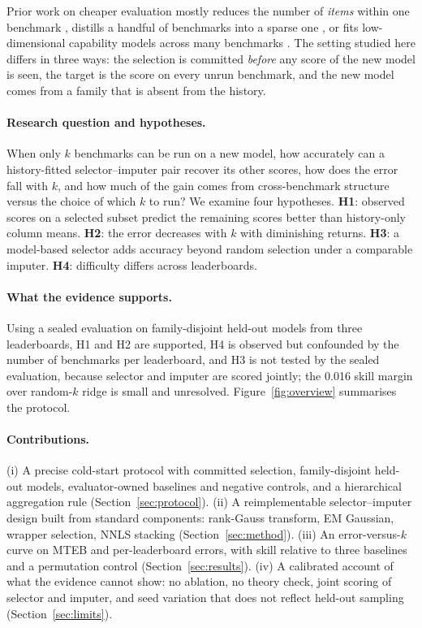 \documentclass{article}
\begin{document}
Prior work on cheaper evaluation mostly reduces the number of \emph{items} within one benchmark \citep{Polo2024TinyBenchmarks,Vivek2024AnchorPoints,Perlitz2024EfficientBenchmarking}, distills a handful of benchmarks into a sparse one \citep{Kipnis2024Metabench}, or fits low-dimensional capability models across many benchmarks \citep{Ruan2024ObservationalScaling,Polo2024Sloth}. The setting studied here differs in three ways: the selection is committed \emph{before} any score of the new model is seen, the target is the score on every unrun benchmark, and the new model comes from a family that is absent from the history.

\paragraph{Research question and hypotheses.} When only $k$ benchmarks can be run on a new model, how accurately can a history-fitted selector--imputer pair recover its other scores, how does the error fall with $k$, and how much of the gain comes from cross-benchmark structure versus the choice of which $k$ to run? We examine four hypotheses.
\textbf{H1}: observed scores on a selected subset predict the remaining scores better than history-only column means.
\textbf{H2}: the error decreases with $k$ with diminishing returns.
\textbf{H3}: a model-based selector adds accuracy beyond random selection under a comparable imputer.
\textbf{H4}: difficulty differs across leaderboards.

\paragraph{What the evidence supports.} Using a sealed evaluation on family-disjoint held-out models from three leaderboards, H1 and H2 are supported, H4 is observed but confounded by the number of benchmarks per leaderboard, and H3 is not tested by the sealed evaluation, because selector and imputer are scored jointly; the 0.016 skill margin over random-$k$ ridge is small and unresolved. Figure~\ref{fig:overview} summarises the protocol.

\paragraph{Contributions.}
(i) A precise cold-start protocol with committed selection, family-disjoint held-out models, evaluator-owned baselines and negative controls, and a hierarchical aggregation rule (Section~\ref{sec:protocol}).
(ii) A reimplementable selector--imputer design built from standard components: rank-Gauss transform, EM Gaussian, wrapper selection, NNLS stacking (Section~\ref{sec:method}).
(iii) An error-versus-$k$ curve on MTEB and per-leaderboard errors, with skill relative to three baselines and a permutation control (Section~\ref{sec:results}).
(iv) A calibrated account of what the evidence cannot show: no ablation, no theory check, joint scoring of selector and imputer, and seed variation that does not reflect held-out sampling (Section~\ref{sec:limits}).
\end{document}
